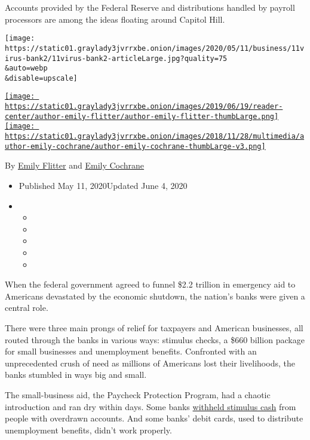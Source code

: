 Accounts provided by the Federal Reserve and distributions handled by
payroll processors are among the ideas floating around Capitol Hill.

\texttt{[image: https://static01.graylady3jvrrxbe.onion/images/2020/05/11/business/11virus-bank2/11virus-bank2-articleLarge.jpg?quality=75\\\&auto=webp\\\&disable=upscale]}

\href{https://www.nytimes3xbfgragh.onion/by/emily-flitter}{\texttt{[image: https://static01.graylady3jvrrxbe.onion/images/2019/06/19/reader-center/author-emily-flitter/author-emily-flitter-thumbLarge.png]}}\href{https://www.nytimes3xbfgragh.onion/by/emily-cochrane}{\texttt{[image: https://static01.graylady3jvrrxbe.onion/images/2018/11/28/multimedia/author-emily-cochrane/author-emily-cochrane-thumbLarge-v3.png]}}

By \href{https://www.nytimes3xbfgragh.onion/by/emily-flitter}{Emily
Flitter} and
\href{https://www.nytimes3xbfgragh.onion/by/emily-cochrane}{Emily
Cochrane}

\begin{itemize}
\item
  Published May 11, 2020Updated June 4, 2020
\item
  \begin{itemize}
  \item
  \item
  \item
  \item
  \item
  \end{itemize}
\end{itemize}

When the federal government agreed to funnel \$2.2 trillion in emergency
aid to Americans devastated by the economic shutdown, the nation's banks
were given a central role.

There were three main prongs of relief for taxpayers and American
businesses, all routed through the banks in various ways: stimulus
checks, a \$660 billion package for small businesses and unemployment
benefits. Confronted with an unprecedented crush of need as millions of
Americans lost their livelihoods, the banks stumbled in ways big and
small.

The small-business aid, the Paycheck Protection Program, had a chaotic
introduction and ran dry within days. Some banks
\href{https://www.nytimes3xbfgragh.onion/2020/04/16/business/stimulus-paychecks-garnish-banks.html}{withheld
stimulus cash} from people with overdrawn accounts. And some banks'
debit cards, used to distribute unemployment benefits, didn't work
properly.

